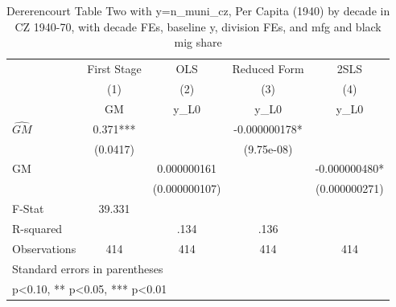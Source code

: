 \begin{table}[htbp]\centering
\def\sym#1{\ifmmode^{#1}\else\(^{#1}\)\fi}
\caption{Dererencourt Table Two with y=n\_muni\_cz, Per Capita (1940) by decade in CZ 1940-70, with decade FEs, baseline y, division FEs, and mfg and black mig share}
\begin{tabular}{l*{4}{c}}
\toprule
                    & First Stage   &         OLS   &Reduced Form   &        2SLS   \\
                    &\multicolumn{1}{c}{(1)}&\multicolumn{1}{c}{(2)}&\multicolumn{1}{c}{(3)}&\multicolumn{1}{c}{(4)}\\
                    &\multicolumn{1}{c}{GM}&\multicolumn{1}{c}{y\_L0}&\multicolumn{1}{c}{y\_L0}&\multicolumn{1}{c}{y\_L0}\\
\midrule
$\hat{GM}$          &       0.371***&               &-0.000000178*  &               \\
                    &    (0.0417)   &               &  (9.75e-08)   &               \\
\addlinespace
GM                  &               & 0.000000161   &               &-0.000000480*  \\
                    &               &(0.000000107)   &               &(0.000000271)   \\
\midrule
F-Stat              &      39.331   &               &               &               \\
R-squared           &               &        .134   &        .136   &               \\
Observations        &         414   &         414   &         414   &         414   \\
\bottomrule
\multicolumn{5}{l}{\footnotesize Standard errors in parentheses}\\
\multicolumn{5}{l}{\footnotesize * p<0.10, ** p<0.05, *** p<0.01}\\
\end{tabular}
\end{table}
